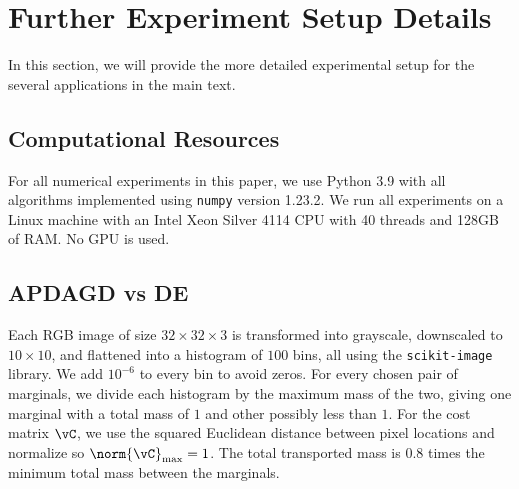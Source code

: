 \section{Further Experiment Setup Details}
In this section, we will provide the more detailed experimental setup for the several applications in the main text. 
\subsection{Computational Resources}

For all numerical experiments in this paper, we use Python 3.9 with all algorithms implemented using \texttt{numpy} version 1.23.2. We run all experiments on a Linux machine with an Intel Xeon Silver 4114 CPU with 40 threads and 128GB of RAM. No GPU is used.

\subsection{APDAGD vs DE}
Each RGB image of size $32 \times 32 \times 3$ 
is transformed into grayscale, downscaled to $10 \times 10$, and flattened into a histogram of $100$ bins, all using the \texttt{scikit-image} library. 
We add $10^{-6}$ to every bin to avoid zeros. For every chosen pair of marginals, we divide each histogram by the maximum mass of the two, giving one marginal with a total mass of $1$ and other possibly less than $1$. For the cost matrix $\vC$, we use the squared Euclidean distance between pixel locations and normalize so $\norm{\vC}_\text{max} = 1$. The total transported mass is $0.8$ times the minimum total mass between the marginals. 


